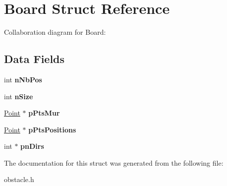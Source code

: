 \hypertarget{struct_board}{}\section{Board Struct Reference}
\label{struct_board}


Collaboration diagram for Board\+:
\subsection*{Data Fields}
\begin{DoxyCompactItemize}
\item 
\hypertarget{struct_board_a5144d35dd645892013c497cebb2e9b1f}{}int {\bfseries n\+Nb\+Pos}\label{struct_board_a5144d35dd645892013c497cebb2e9b1f}

\item 
\hypertarget{struct_board_a69eba13a7543e1379e705b54823531a9}{}int {\bfseries n\+Size}\label{struct_board_a69eba13a7543e1379e705b54823531a9}

\item 
\hypertarget{struct_board_a15b7375925a07516d82c52733ec16874}{}\hyperlink{struct_point}{Point} $\ast$ {\bfseries p\+Pts\+Mur}\label{struct_board_a15b7375925a07516d82c52733ec16874}

\item 
\hypertarget{struct_board_ab251fa666350a133b8b089a26c93a623}{}\hyperlink{struct_point}{Point} $\ast$ {\bfseries p\+Pts\+Positions}\label{struct_board_ab251fa666350a133b8b089a26c93a623}

\item 
\hypertarget{struct_board_a1548ed096f3589f9a471cfad9795f6cd}{}int $\ast$ {\bfseries pn\+Dirs}\label{struct_board_a1548ed096f3589f9a471cfad9795f6cd}

\end{DoxyCompactItemize}


The documentation for this struct was generated from the following file\+:\begin{DoxyCompactItemize}
\item 
obstacle.\+h\end{DoxyCompactItemize}
